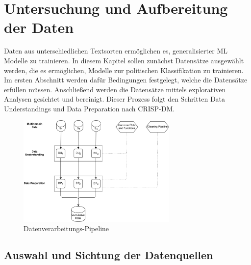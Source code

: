 
\chapter{Untersuchung und Aufbereitung der Daten} \label{ch:crispDm_1}

Daten aus unterschiedlichen Textsorten ermöglichen es, generalisierter \ac{ML} Modelle zu trainieren. In diesem Kapitel sollen zunächst Datensätze ausgewählt werden, die es ermöglichen, Modelle zur politischen Klassifikation zu trainieren. Im ersten Abschnitt werden dafür Bedingungen festgelegt, welche die Datensätze erfüllen müssen. Anschließend werden die Datensätze mittels explorativen Analysen gesichtet und bereinigt. Dieser Prozess folgt den Schritten Data Understandings und Data Preparation nach \ac{CRISP-DM}.

\begin{figure}[H]
    \centering
    \includegraphics[width=0.7\textwidth]{data/images/data_flow_v2_1.png}
    \caption[Datenverarbeitungs-Pipeline]{Datenverarbeitungs-Pipeline} \label{fig:dataFlow_1}
\end{figure}


\section{Auswahl und Sichtung der Datenquellen} \label{sec:dataUnderstanding}




